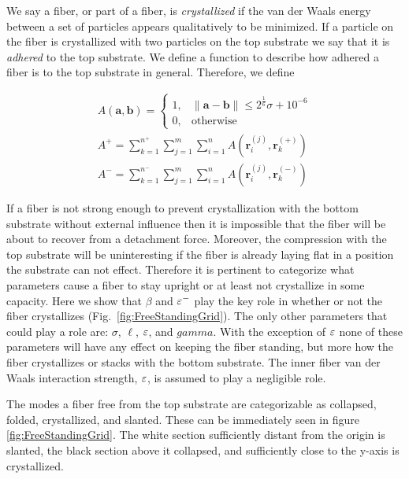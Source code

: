 We say a fiber, or part of a fiber, is \textit{crystallized} if the van der Waals energy between a set of particles appears qualitatively to be minimized. If a particle on the fiber is crystallized with two particles on the top substrate we say that it is \textit{adhered} to the top substrate. We define a function to describe how adhered a fiber is to the top substrate in general. Therefore, we define


\begin{eqnarray}
	A(\textbf{a}, \textbf{b}) = \left\{ 
		\begin{array}{ll}
			1, & \|\textbf{a} - \textbf{b}\| \leq 2^{\frac{1}{6}} \sigma + 10^{-6}\\
			0, & \mbox{otherwise}
		\end{array}
		\right.  \\
	A^+ = \sum_{k=1}^{n^+} \sum_{j=1}^{m} \sum_{i=1}^{n} A(\textbf{r}_i^{(j)},\textbf{r}_k^{(+)}) \label{eqn:adhesion:top} \\ 
	A^- = \sum_{k=1}^{n^-} \sum_{j=1}^{m} \sum_{i=1}^{n} A(\textbf{r}_i^{(j)},\textbf{r}_k^{(-)}) \label{eqn:adhesion:bottom}
\end{eqnarray}

If a fiber is not strong enough to prevent crystallization with the bottom substrate without external influence then it is impossible that the fiber will be about to recover from a detachment force. Moreover, the compression with the top substrate will be uninteresting if the fiber is already laying flat in a position the substrate can not effect. Therefore it is pertinent to categorize what parameters cause a fiber to stay upright or at least not crystallize in some capacity. Here we show that $\beta$ and $\varepsilon^-$ play the key role in whether or not the fiber crystallizes (Fig.~\ref{fig:FreeStandingGrid}). The only other parameters that could play a role are: $\sigma$, $\ell$, $\varepsilon$, and $gamma$. With the exception of $\varepsilon$ none of these parameters will have any effect on keeping the fiber standing, but more how the fiber crystallizes or stacks with the bottom substrate. The inner fiber van der Waals interaction strength, $\varepsilon$, is assumed to play a negligible role.

The modes a fiber free from the top substrate are categorizable as collapsed, folded, crystallized, and slanted. These can be immediately seen in figure \ref{fig:FreeStandingGrid}. The white section sufficiently distant from the origin is slanted, the black section above it collapsed, and sufficiently close to the y-axis is crystallized.

